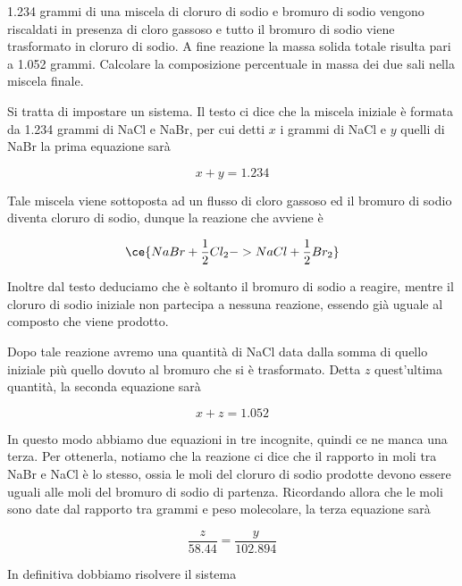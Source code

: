 \begin{esercizio}
    1.234 grammi di una miscela di cloruro di sodio e bromuro di sodio vengono riscaldati in presenza di cloro gassoso e tutto il bromuro di sodio viene trasformato in cloruro di sodio. A fine reazione la massa solida totale risulta pari a 1.052 grammi. Calcolare la composizione percentuale in massa dei due sali nella miscela finale.
\end{esercizio}
\begin{soluzione}
    Si tratta di impostare un sistema. Il testo ci dice che la miscela iniziale è formata da 1.234 grammi di NaCl e NaBr, per cui detti $x$ i grammi di NaCl e $y$ quelli di NaBr la prima equazione sarà

\begin{equation*}
    x + y=1.234
\end{equation*}

Tale miscela viene sottoposta ad un flusso di cloro gassoso ed il bromuro di sodio diventa cloruro di sodio, dunque la reazione che avviene è

\begin{equation*}
    \ce{NaBr + \frac{1}{2}Cl_2 -> NaCl + \frac{1}{2}Br_2}
\end{equation*}

Inoltre dal testo deduciamo che è soltanto il bromuro di sodio a reagire, mentre il cloruro di sodio iniziale non partecipa a nessuna reazione, essendo già uguale al composto che viene prodotto.

Dopo tale reazione avremo una quantità di NaCl data dalla somma di quello iniziale più quello dovuto al bromuro che si è trasformato. Detta $z$ quest'ultima quantità, la seconda equazione sarà

\begin{equation*}
    x + z=1.052
\end{equation*}

In questo modo abbiamo due equazioni in tre incognite, quindi ce ne manca una terza. Per ottenerla, notiamo che la reazione ci dice che il rapporto in moli tra NaBr e NaCl è lo stesso, ossia le moli del cloruro di sodio prodotte devono essere uguali alle moli del bromuro di sodio di partenza. Ricordando allora che le moli sono date dal rapporto tra grammi e peso molecolare, la terza equazione sarà

\begin{equation*}
    \frac{z}{58.44}=\frac{y}{102.894}
\end{equation*}

In definitiva dobbiamo risolvere il sistema


\end{soluzione}
